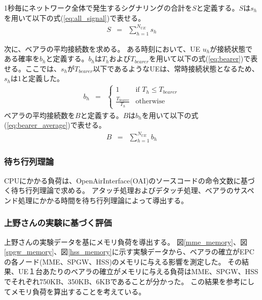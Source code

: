\documentclass[a4j]{ujarticle}
\begin{document}
1秒毎にネットワーク全体で発生するシグナリングの合計を$S$と定義する。$S$は$s_h$を用いて以下の式(\ref{eq:all_signal})で表せる。
\begin{eqnarray}
  S & = & \sum_{h = 1}^{N_{UE}} s_h \label{eq:all_signal}
\end{eqnarray}

次に、ベアラの平均接続数を求める。
ある時刻において、UE $u_h$が接続状態である確率を$b_h$と定義する。$b_h$は$T_h$および$T_{bearer}$を用いて以下の式(\ref{eq:bearer})で表せる。ここでは、$s_h$が$T_{bearer}$以下であるようなUEは、常時接続状態となるため、$s_h$は1と定義した。
\begin{eqnarray}
	b_h & = &
  \begin{cases}
    1 & \text{if $T_h \le T_{bearer}$}\\
    \frac{T_{bearer}}{T_h} & \text{otherwise}
  \end{cases}
  \label{eq:bearer}
\end{eqnarray}
ベアラの平均接続数を$B$と定義する。$B$は$b_h$を用いて以下の式(\ref{eq:bearer_average})で表せる。
\begin{eqnarray}
  B & = & \sum_{h = 1}^{N_{UE}} b_h \label{eq:bearer_average}
\end{eqnarray}


\subsubsection{待ち行列理論}
\label{sec:cpu}
CPUにかかる負荷は、OpenAirInterface(OAI)\cite{OpenAirInterface}のソースコードの命令文数に基づく待ち行列理論で求める。
アタッチ処理およびデタッチ処理、ベアラのサスペンド処理にかかる時間を待ち行列理論によって導出する。

\subsubsection{上野さんの実験に基づく評価}
\label{sec:memory}
上野さんの実験データを基にメモリ負荷を導出する。
図\ref{mme_memory}、図\ref{spgw_memory}、図\ref{hss_memory}に示す実験データから、ベアラの確立がEPCの各ノード(MME、SPGW、HSS)のメモリに与える影響を測定した。
その結果、UE１台あたりのベアラの確立がメモリに与える負荷はMME、SPGW、HSSでそれぞれ750KB、350KB、6KBであることが分かった。
この結果を参考にしてメモリ負荷を算出することを考えている。
\end{document}
